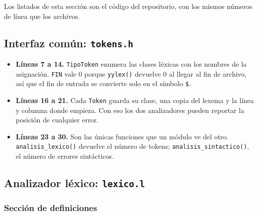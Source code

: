 \documentclass[12pt]{article}
\newcommand{\cmd}[1]{\texttt{\small #1}}
\begin{document}
Los listados de esta sección son el código del repositorio, con los mismos números de línea que
los archivos.

\subsection{Interfaz común: \texttt{tokens.h}}



\begin{itemize}[leftmargin=1.1cm,itemsep=0.25em]
\item \textbf{Líneas 7 a 14.} \cmd{TipoToken} enumera las clases léxicas con los nombres de la
asignación. \cmd{FIN} vale 0 porque \cmd{yylex()} devuelve 0 al llegar al fin de archivo, así
que el fin de entrada se convierte solo en el símbolo \cmd{\$}.
\item \textbf{Líneas 16 a 21.} Cada \cmd{Token} guarda su clase, una copia del lexema y la línea
y columna donde empieza. Con eso los dos analizadores pueden reportar la posición de cualquier
error.
\item \textbf{Líneas 23 a 30.} Son las únicas funciones que un módulo ve del otro.
\cmd{analisis\_lexico()} devuelve el número de tokens; \cmd{analisis\_sintactico()}, el número
de errores sintácticos.
\end{itemize}

\subsection{Analizador léxico: \texttt{lexico.l}}
\label{sec:lexico}

\subsubsection*{Sección de definiciones}


\end{document}
